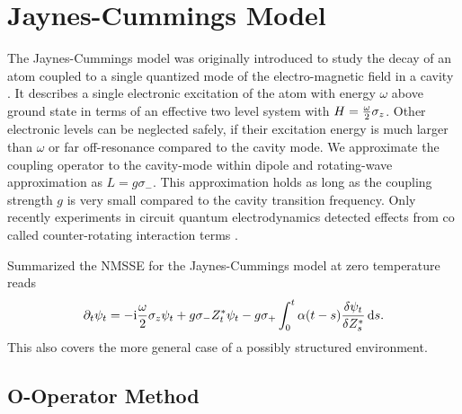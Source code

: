 \section{Jaynes-Cummings Model}
\label{sec:nmqsd.two_level}

%
The Jaynes-Cummings model was originally introduced to study the decay of an atom coupled to a single quantized mode of the electro-magnetic field in a cavity \cite{JaCu63_radiation_theory}.
It describes a single electronic excitation of the atom with energy $\omega$ above ground state in terms of an effective two level system with $H = \frac{\omega}{2}\sigma_z$.
Other electronic levels can be neglected safely, if their excitation energy is much larger than $\omega$ or far off-resonance compared to the cavity mode.
We approximate the coupling operator to the cavity-mode within dipole and rotating-wave approximation as $L = g\sigma_-$.
This approximation holds as long as the coupling strength $g$ is very small compared to the cavity transition frequency.
Only recently experiments in circuit quantum electrodynamics detected effects from co called counter-rotating interaction terms \cite{NiDeHu10_circuit_qed}.

Summarized the NMSSE for the Jaynes-Cummings model at zero temperature reads
\begin{equation}
  \partial_t \psi_t = -\mathrm{i}\frac{\omega}{2}\sigma_z\psi_t + g \sigma_- {Z}^*_t \psi_t - g\sigma_+ \int_0^t \alpha(t - s) \frac{\delta\psi_t}{\delta {Z}^*_s} \, \mathrm{d} s.
  \label{eq:nmqsd.nmsse_twolevel}
\end{equation}
This also covers the more general case of a possibly structured environment.


\subsection{O-Operator Method}
\label{sub:nmqsd.two_level.o}
%

